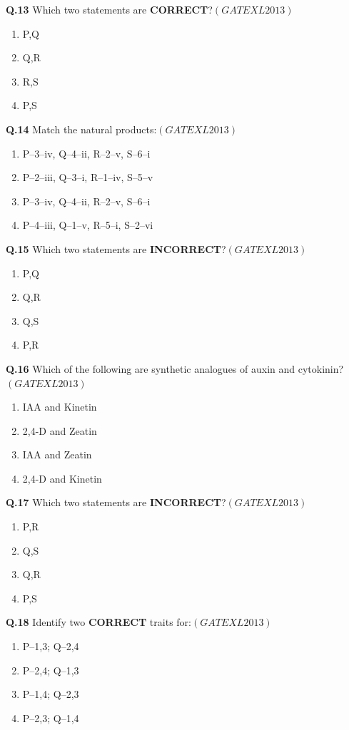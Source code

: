 \documentclass[12pt]{article}
\theoremstyle{remark}
\providecommand{\brak}[1]{\ensuremath{\left(#1\right)}}
\begin{document}
\textbf{Q.13} Which two statements are \textbf{CORRECT}?\hfill  \textit{\brak{GATE XL 2013}}
\begin{enumerate}
    \item P,Q
    \item Q,R
    \item R,S
    \item P,S
\end{enumerate}

\textbf{Q.14} Match the natural products:\hfill  \textit{\brak{GATE XL 2013}}
\begin{enumerate}
    \item P–3–iv, Q–4–ii, R–2–v, S–6–i
    \item P–2–iii, Q–3–i, R–1–iv, S–5–v
    \item P–3–iv, Q–4–ii, R–2–v, S–6–i
    \item P–4–iii, Q–1–v, R–5–i, S–2–vi
\end{enumerate}

\textbf{Q.15} Which two statements are \textbf{INCORRECT}?\hfill  \textit{\brak{GATE XL 2013}}
\begin{enumerate}
    \item P,Q
    \item Q,R
    \item Q,S
    \item P,R
\end{enumerate}

\textbf{Q.16} Which of the following are synthetic analogues of auxin and cytokinin?\hfill  \textit{\brak{GATE XL 2013}}
\begin{enumerate}
    \item IAA and Kinetin
    \item 2,4-D and Zeatin
    \item IAA and Zeatin
    \item 2,4-D and Kinetin
\end{enumerate}

\textbf{Q.17} Which two statements are \textbf{INCORRECT}?\hfill  \textit{\brak{GATE XL 2013}}
\begin{enumerate}
    \item P,R
    \item Q,S
    \item Q,R
    \item P,S
\end{enumerate}

\textbf{Q.18} Identify two \textbf{CORRECT} traits for:\hfill  \textit{\brak{GATE XL 2013}}
\begin{enumerate}
    \item P–1,3; Q–2,4
    \item P–2,4; Q–1,3
    \item P–1,4; Q–2,3
    \item P–2,3; Q–1,4
\end{enumerate}
\end{document}

